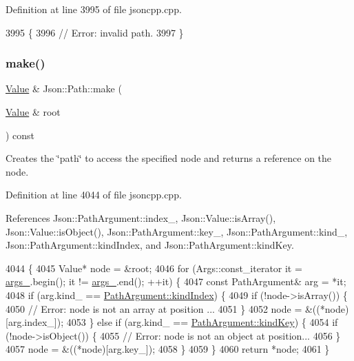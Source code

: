 Definition at line 3995 of file jsoncpp.\+cpp.


\begin{DoxyCode}
3995                                                      \{
3996   \textcolor{comment}{// Error: invalid path.}
3997 \}
\end{DoxyCode}
\mbox{\label{class_json_1_1_path_a858f9426f0f7bbe0450644d72b44e26b}} 
\subsubsection{\texorpdfstring{make()}{make()}}
{\footnotesize\ttfamily \hyperlink{class_json_1_1_value}{Value} \& Json\+::\+Path\+::make (\begin{DoxyParamCaption}\item[{\hyperlink{class_json_1_1_value}{Value} \&}]{root }\end{DoxyParamCaption}) const}

Creates the \char`\"{}path\char`\"{} to access the specified node and returns a reference on the node. 

Definition at line 4044 of file jsoncpp.\+cpp.



References Json\+::\+Path\+Argument\+::index\+\_\+, Json\+::\+Value\+::is\+Array(), Json\+::\+Value\+::is\+Object(), Json\+::\+Path\+Argument\+::key\+\_\+, Json\+::\+Path\+Argument\+::kind\+\_\+, Json\+::\+Path\+Argument\+::kind\+Index, and Json\+::\+Path\+Argument\+::kind\+Key.


\begin{DoxyCode}
4044                                    \{
4045   Value* node = &root;
4046   \textcolor{keywordflow}{for} (Args::const\_iterator it = \hyperlink{class_json_1_1_path_af33d0de7ee9f99d3e361bdf504dc2bc7}{args\_}.begin(); it != \hyperlink{class_json_1_1_path_af33d0de7ee9f99d3e361bdf504dc2bc7}{args\_}.end(); ++it) \{
4047     \textcolor{keyword}{const} PathArgument& arg = *it;
4048     \textcolor{keywordflow}{if} (arg.kind\_ == \hyperlink{class_json_1_1_path_argument_a2420bbad778573c147e578701b84d9b9ae5a976b898111903334cb131f5e03dc4}{PathArgument::kindIndex}) \{
4049       \textcolor{keywordflow}{if} (!node->isArray()) \{
4050         \textcolor{comment}{// Error: node is not an array at position ...}
4051       \}
4052       node = &((*node)[arg.index\_]);
4053     \} \textcolor{keywordflow}{else} \textcolor{keywordflow}{if} (arg.kind\_ == \hyperlink{class_json_1_1_path_argument_a2420bbad778573c147e578701b84d9b9a74f5968d06c01701b7a46092c33ba7d1}{PathArgument::kindKey}) \{
4054       \textcolor{keywordflow}{if} (!node->isObject()) \{
4055         \textcolor{comment}{// Error: node is not an object at position...}
4056       \}
4057       node = &((*node)[arg.key\_]);
4058     \}
4059   \}
4060   \textcolor{keywordflow}{return} *node;
4061 \}
\end{DoxyCode}
\mbox{\label{class_json_1_1_path_a362a420a47acb1a1f9c79173cbfef94d}} 
